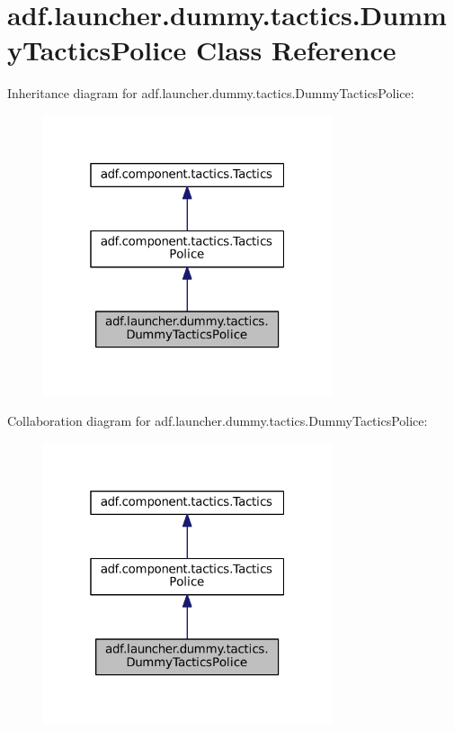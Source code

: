 \hypertarget{classadf_1_1launcher_1_1dummy_1_1tactics_1_1DummyTacticsPolice}{}\section{adf.\+launcher.\+dummy.\+tactics.\+Dummy\+Tactics\+Police Class Reference}
\label{classadf_1_1launcher_1_1dummy_1_1tactics_1_1DummyTacticsPolice}


Inheritance diagram for adf.\+launcher.\+dummy.\+tactics.\+Dummy\+Tactics\+Police\+:
\nopagebreak
\begin{figure}[H]
\begin{center}
\leavevmode
\includegraphics[width=241pt]{classadf_1_1launcher_1_1dummy_1_1tactics_1_1DummyTacticsPolice__inherit__graph}
\end{center}
\end{figure}


Collaboration diagram for adf.\+launcher.\+dummy.\+tactics.\+Dummy\+Tactics\+Police\+:
\nopagebreak
\begin{figure}[H]
\begin{center}
\leavevmode
\includegraphics[width=241pt]{classadf_1_1launcher_1_1dummy_1_1tactics_1_1DummyTacticsPolice__coll__graph}
\end{center}
\end{figure}
